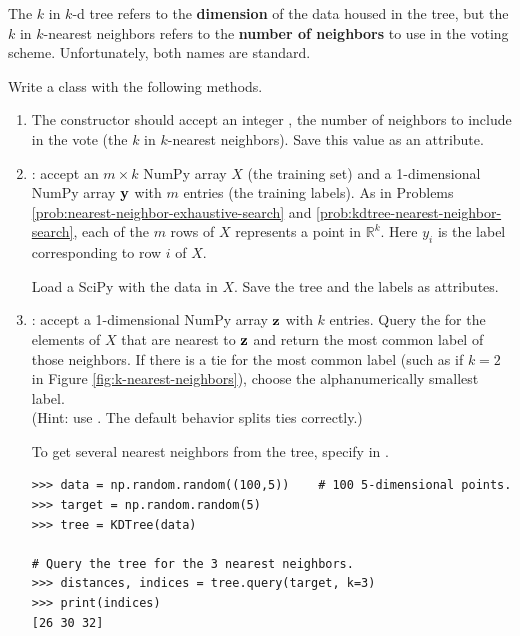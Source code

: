 \begin{warn}
The $k$ in $k$-d tree refers to the \textbf{dimension} of the data housed in the tree, but the $k$ in $k$-nearest neighbors refers to the \textbf{number of neighbors} to use in the voting scheme.
Unfortunately, both names are standard.
\end{warn}

\begin{problem} %
\label{prob:kneighbors-classifier}
Write a  class with the following methods.
\begin{enumerate}
\item The constructor should accept an integer , the number of neighbors to include in the vote (the $k$ in $k$-nearest neighbors).
Save this value as an attribute.

\item {}: accept an $m\times k$ NumPy array $X$ (the training set) and a 1-dimensional NumPy array $\mathbf{y}$ with $m$ entries (the training labels).
As in Problems \ref{prob:nearest-neighbor-exhaustive-search} and \ref{prob:kdtree-nearest-neighbor-search}, each of the $m$ rows of $X$ represents a point in $\mathbb{R}^k$.
Here $y_i$ is the label corresponding to row $i$ of $X$.

Load a SciPy  with the data in $X$.
Save the tree and the labels as attributes.

\item {}: accept a 1-dimensional NumPy array $\mathbf{z}$ with $k$ entries.
Query the  for the  elements of $X$ that are nearest to $\mathbf{z}$ and return the most common label of those neighbors.
If there is a tie for the most common label (such as if $k=2$ in Figure \ref{fig:k-nearest-neighbors}), choose the alphanumerically smallest label.
\\(Hint: use . The default behavior splits ties correctly.)

To get several nearest neighbors from the tree, specify  in .
\begin{lstlisting}
>>> data = np.random.random((100,5))    # 100 5-dimensional points.
>>> target = np.random.random(5)
>>> tree = KDTree(data)

# Query the tree for the 3 nearest neighbors.
>>> distances, indices = tree.query(target, k=3)
>>> print(indices)
[26 30 32]
\end{lstlisting}
\end{enumerate}
\end{problem}

